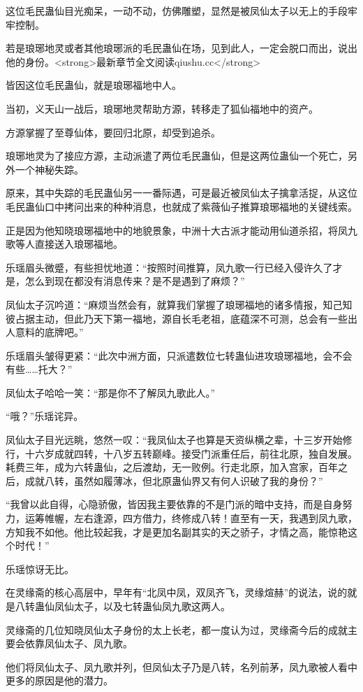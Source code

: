 \begin{this_body}
这位毛民蛊仙目光痴呆，一动不动，仿佛雕塑，显然是被凤仙太子以无上的手段牢牢控制。

若是琅琊地灵或者其他琅琊派的毛民蛊仙在场，见到此人，一定会脱口而出，说出他的身份。<strong>最新章节全文阅读qiushu.cc</strong>

皆因这位毛民蛊仙，就是琅琊福地中人。

当初，义天山一战后，琅琊地灵帮助方源，转移走了狐仙福地中的资产。

方源掌握了至尊仙体，要回归北原，却受到追杀。

琅琊地灵为了接应方源，主动派遣了两位毛民蛊仙，但是这两位蛊仙一个死亡，另外一个神秘失踪。

原来，其中失踪的毛民蛊仙另一一番际遇，可是最近被凤仙太子擒拿活捉，从这位毛民蛊仙口中拷问出来的种种消息，也就成了紫薇仙子推算琅琊福地的关键线索。

正是因为他知晓琅琊福地中的地貌景象，中洲十大古派才能动用仙道杀招，将凤九歌等人直接送入琅琊福地。

乐瑶眉头微蹙，有些担忧地道：“按照时间推算，凤九歌一行已经入侵许久了才是，怎么到现在都没有消息传来？是不是遇到了麻烦？”

凤仙太子沉吟道：“麻烦当然会有，就算我们掌握了琅琊福地的诸多情报，知己知彼占据主动，但此乃天下第一福地，源自长毛老祖，底蕴深不可测，总会有一些出人意料的底牌吧。”

乐瑶眉头皱得更紧：“此次中洲方面，只派遣数位七转蛊仙进攻琅琊福地，会不会有些……托大？”

凤仙太子哈哈一笑：“那是你不了解凤九歌此人。”

“哦？”乐瑶诧异。

凤仙太子目光远眺，悠然一叹：“我凤仙太子也算是天资纵横之辈，十三岁开始修行，十六岁成就四转，十八岁五转巅峰。接受门派重任后，前往北原，独自发展。耗费三年，成为六转蛊仙，之后渡劫，无一败例。行走北原，加入宫家，百年之后，成就八转，虽然如履薄冰，但北原蛊仙界又有何人识破了我的身份？”

“我曾以此自得，心隐骄傲，皆因我主要依靠的不是门派的暗中支持，而是自身努力，运筹帷幄，左右逢源，四方借力，终修成八转！直至有一天，我遇到凤九歌，方知我不如他。他比较起我，才是更加名副其实的天之骄子，才情之高，能惊艳这个时代！”

乐瑶惊讶无比。

在灵缘斋的核心高层中，早年有“北凤中凤，双凤齐飞，灵缘煊赫”的说法，说的就是八转蛊仙凤仙太子，以及七转蛊仙凤九歌这两人。

灵缘斋的几位知晓凤仙太子身份的太上长老，都一度认为过，灵缘斋今后的成就主要会依靠凤仙太子、凤九歌。

他们将凤仙太子、凤九歌并列，但凤仙太子乃是八转，名列前茅，凤九歌被人看中更多的原因是他的潜力。


\end{this_body}

